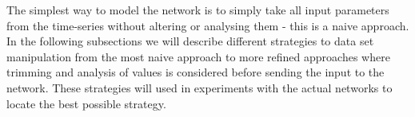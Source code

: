The simplest way to model the network is to simply take all input parameters from the time-series without altering or analysing them - this is a naive approach. In the following subsections we will describe different strategies to data set manipulation from the most naive approach to more refined approaches where trimming and analysis of values is considered before sending the input to the network. These strategies will used in experiments with the actual networks to locate the best possible strategy.